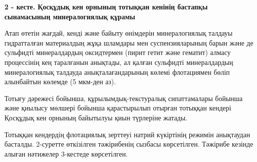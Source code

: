 {{\bfseries 2 - кесте. Қосқұдық кен орнының тотыққан кенінің бастапқы
сынамасының минералогиялық құрамы}


Атап өтетін жағдай, кенді және байыту өнімдерін минералогиялық талдауы
гидратталған материалдың жұқа шламдары мен суспензияларының барын және
де сульфидті минералдардың оксидтермен (пирит гетит және гематит) алмасу
процессінің кең таралғанын анықтады, ал қалған сульфидті минералдардың
минералогиялық талдауда анықталағандарының көлемі флотациямен бөліп
алынбайтын көлемде (5 мкм-ден аз).

Тотығу дәрежесі бойынша, құрылымдық-текстуралық сипаттамалары бойынша
және қиылысу мөлшері бойынша қарастырылып отырған тотыққан кендері
Қосқұдық кен орнының байытылуы қиын түрлеріне жатады.

Тотыққан кендердің флотациялық зерттеуі натрий күкіртінің режимін
анықтаудан басталды. 2-суретте өткізілген тәжірибенің сызбасы
көрсетілген. Тәжірибе кезінде алыған нәтижелер 3-кестеде көрсетілген.

}
